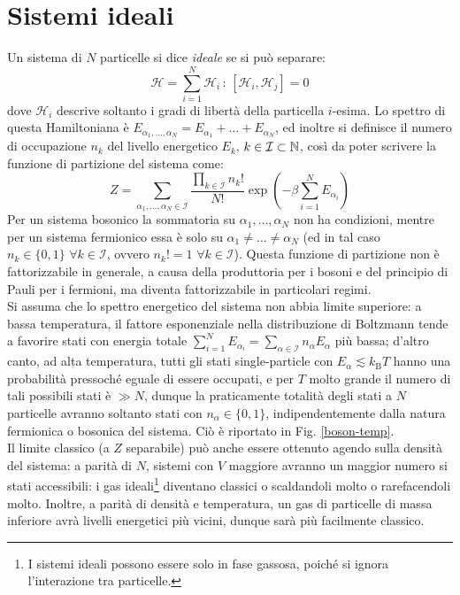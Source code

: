 \section{Sistemi ideali}

Un sistema di $ N $ particelle si dice \textit{ideale} se si può separare:
\begin{equation}
	\mathcal{H} = \sum_{i = 1}^N \mathcal{H}_i \,:\, [\mathcal{H}_i , \mathcal{H}_j] = 0
\end{equation}
dove $ \mathcal{H}_i $ descrive soltanto i gradi di libertà della particella $ i $-esima. Lo spettro di questa Hamiltoniana è $ E_{\alpha_1, \dots, \alpha_N} = E_{\alpha_1} + \dots + E_{\alpha_N} $, ed inoltre si definisce il numero di occupazione $ n_k $ del livello energetico $ E_k $, $ k \in \mathcal{I} \subset \mathbb{N} $, così da poter scrivere la funzione di partizione del sistema come:
\begin{equation}
	Z = \sum_{\alpha_1, \dots, \alpha_N \in \mathcal{I}} \frac{\prod_{k \in \mathcal{I}} n_k!}{N!} \exp \left( - \beta \sum_{i = 1}^N E_{\alpha_i} \right)
	\label{eq:z-sing-part}
\end{equation}
Per un sistema bosonico la sommatoria su $ \alpha_1, \dots, \alpha_N $ non ha condizioni, mentre per un sistema fermionico essa è solo su $ \alpha_1 \neq \dots \neq \alpha_N $ (ed in tal caso $ n_k \in \{0,1\} \,\,\forall k \in \mathcal{I} $, ovvero $ n_k! = 1 \,\,\forall k \in \mathcal{I} $). Questa funzione di partizione non è fattorizzabile in generale, a causa della produttoria per i bosoni e del principio di Pauli per i fermioni, ma diventa fattorizzabile in particolari regimi. \\
Si assuma che lo spettro energetico del sistema non abbia limite superiore: a bassa temperatura, il fattore esponenziale nella distribuzione di Boltzmann tende a favorire stati con energia totale $ \sum_{i = 1}^N E_{\alpha_i} = \sum_{\alpha \in \mathcal{I}} n_\alpha E_\alpha $ più bassa; d'altro canto, ad alta temperatura, tutti gli stati single-particle con $ E_\alpha \lesssim k_\text{B} T $ hanno una probabilità pressoché eguale di essere occupati, e per $ T $ molto grande il numero di tali possibili stati è $ \gg N $, dunque la praticamente totalità degli stati a $ N $ particelle avranno soltanto stati con $ n_\alpha \in \{0,1\} $, indipendentemente dalla natura fermionica o bosonica del sistema. Ciò è riportato in Fig. \ref{boson-temp}. \\
Il limite classico (a $ Z $ separabile) può anche essere ottenuto agendo sulla densità del sistema: a parità di $ N $, sistemi con $ V $ maggiore avranno un maggior numero si stati accessibili: i gas ideali\footnote{I sistemi ideali possono essere solo in fase gassosa, poiché si ignora l'interazione tra particelle.} diventano classici o scaldandoli molto o rarefacendoli molto. Inoltre, a parità di densità e temperatura, un gas di particelle di massa inferiore avrà livelli energetici più vicini, dunque sarà più facilmente classico.

